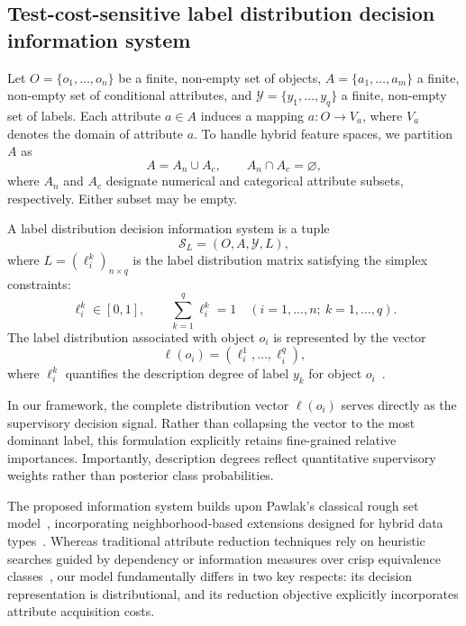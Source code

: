 \subsection{Test-cost-sensitive label distribution decision information system}
\label{subsec:ldl-system}

Let $O=\{o_1,\dots,o_n\}$ be a finite, non-empty set of objects, $A=\{a_1,\dots,a_m\}$ a finite, non-empty set of conditional attributes, and $\mathcal{Y}=\{y_1,\dots,y_q\}$ a finite, non-empty set of labels. Each attribute $a\in A$ induces a mapping $a: O \to V_a$, where $V_a$ denotes the domain of attribute $a$. To handle hybrid feature spaces, we partition $A$ as
\[
A = A_n \cup A_c, \qquad A_n \cap A_c = \varnothing,
\]
where $A_n$ and $A_c$ designate numerical and categorical attribute subsets, respectively. Either subset may be empty.

\begin{definition}
	\label{def:ldl-system}
	A label distribution decision information system is a tuple
	\[
	\mathcal{S}_L = (O, A, \mathcal{Y}, L),
	\]
	where $L = (\ell_i^k)_{n\times q}$ is the label distribution matrix satisfying the simplex constraints:
	\begin{equation}
		\ell_i^k \in [0,1], \qquad \sum_{k=1}^q \ell_i^k = 1 \quad (i=1,\dots,n;\ k=1,\dots,q).
		\label{eq:label-simplex}
	\end{equation}
	The label distribution associated with object $o_i$ is represented by the vector
	\begin{equation}
		\boldsymbol{\ell}(o_i) = (\ell_i^1, \dots, \ell_i^q),
		\label{eq:label-vector}
	\end{equation}
	where $\ell_i^k$ quantifies the description degree of label $y_k$ for object $o_i$~\cite{G1}.
\end{definition}

In our framework, the complete distribution vector $\boldsymbol{\ell}(o_i)$ serves directly as the supervisory decision signal. Rather than collapsing the vector to the most dominant label, this formulation explicitly retains fine-grained relative importances. Importantly, description degrees reflect quantitative supervisory weights rather than posterior class probabilities.

The proposed information system builds upon Pawlak's classical rough set model~\cite{CARS}, incorporating neighborhood-based extensions designed for hybrid data types~\cite{NRS,Y1,HY}. Whereas traditional attribute reduction techniques rely on heuristic searches guided by dependency or information measures over crisp equivalence classes~\cite{SZ,XW,YC,ZM}, our model fundamentally differs in two key respects: its decision representation is distributional, and its reduction objective explicitly incorporates attribute acquisition costs.

